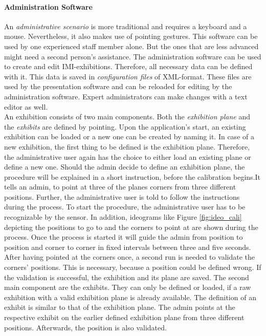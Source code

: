 \paragraph{Administration Software} An \textit{administrative scenario} is more traditional and requires a keyboard and a mouse. Nevertheless, it also makes use of pointing gestures. This software can be used by one experienced staff member alone. But the ones that are less advanced might need a second person's assistance. The administration software can be used to create and edit \ac{IMI}-exhibitions. Therefore, all necessary data can be defined with it. This data is saved in \textit{configuration files} of XML-format. These files are used by the presentation software and can be reloaded for editing by the administration software. Expert administrators can make changes with a text editor as well. 
\\
An exhibition consists of two main components. Both the \textit{exhibition plane} and the \textit{exhibits} are defined by pointing. Upon the application's start, an existing exhibition can be loaded or a new one can be created by naming it. In case of a new exhibition, the first thing to be defined is the exhibition plane. Therefore, the administrative user again has the choice to either load an existing plane or define a new one. Should the admin decide to define an exhibition plane, the procedure will be explained in a short instruction, before the calibration begins.It tells an admin, to point at three of the planes corners from three different positions. Further, the administrative user is told to follow the instructions during the process. To start the procedure, the administrative user has to be recognizable by the sensor. In addition, ideograms like Figure \ref{fig:ideo_cali} depicting the positions to go to and the corners to point at are shown during the process. Once the process is started it will guide the admin from position to position and corner to corner in fixed intervals between three and five seconds. After having pointed at the corners once, a second run is needed to validate the corners' positions. This is necessary, because a position could be defined wrong. If the validation is successful, the exhibition and its plane are saved. The second main component are the exhibits. They can only be defined or loaded, if a raw exhibition with a valid exhibition plane is already available. The definition of an exhibit is similar to that of the exhibition plane. The admin points at the respective exhibit on the earlier defined exhibition plane from three different positions. Afterwards, the position is also validated.

